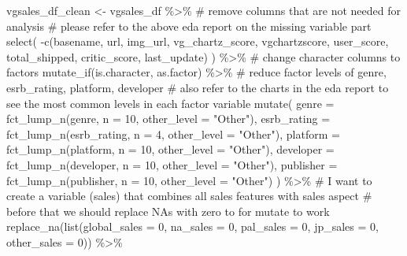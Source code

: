 \documentclass[
  letterpaper,
  DIV=11,
  numbers=noendperiod]{scrartcl}
\newenvironment{Shaded}{\begin{snugshade}}{\end{snugshade}}
\newcommand{\AttributeTok}[1]{\textcolor[rgb]{0.40,0.45,0.13}{#1}}
\newcommand{\CommentTok}[1]{\textcolor[rgb]{0.37,0.37,0.37}{#1}}
\newcommand{\DecValTok}[1]{\textcolor[rgb]{0.68,0.00,0.00}{#1}}
\newcommand{\FunctionTok}[1]{\textcolor[rgb]{0.28,0.35,0.67}{#1}}
\newcommand{\NormalTok}[1]{\textcolor[rgb]{0.00,0.23,0.31}{#1}}
\newcommand{\OtherTok}[1]{\textcolor[rgb]{0.00,0.23,0.31}{#1}}
\newcommand{\SpecialCharTok}[1]{\textcolor[rgb]{0.37,0.37,0.37}{#1}}
\newcommand{\StringTok}[1]{\textcolor[rgb]{0.13,0.47,0.30}{#1}}
\begin{document}
\begin{Shaded}
\begin{Highlighting}[]
\NormalTok{vgsales\_df\_clean }\OtherTok{\textless{}{-}}\NormalTok{ vgsales\_df }\SpecialCharTok{\%\textgreater{}\%}
  \CommentTok{\# remove columns that are not needed for analysis }
  \CommentTok{\# please refer to the above eda report on the missing variable part}
  \FunctionTok{select}\NormalTok{(}
    \SpecialCharTok{{-}}\FunctionTok{c}\NormalTok{(basename, url, img\_url, vg\_chartz\_score, vgchartzscore, }
\NormalTok{       user\_score, total\_shipped, critic\_score, last\_update)}
\NormalTok{    ) }\SpecialCharTok{\%\textgreater{}\%} 
   \CommentTok{\# change character columns to factors}
  \FunctionTok{mutate\_if}\NormalTok{(is.character, as.factor) }\SpecialCharTok{\%\textgreater{}\%} 
  \CommentTok{\# reduce factor levels of genre, esrb\_rating, platform, developer}
  \CommentTok{\# also refer to the charts in the eda report to see the most common levels in each factor variable}
  \FunctionTok{mutate}\NormalTok{(}
    \AttributeTok{genre =} \FunctionTok{fct\_lump\_n}\NormalTok{(genre, }\AttributeTok{n =} \DecValTok{10}\NormalTok{, }\AttributeTok{other\_level =} \StringTok{"Other"}\NormalTok{),}
    \AttributeTok{esrb\_rating =} \FunctionTok{fct\_lump\_n}\NormalTok{(esrb\_rating, }\AttributeTok{n =} \DecValTok{4}\NormalTok{, }\AttributeTok{other\_level =} \StringTok{"Other"}\NormalTok{),}
    \AttributeTok{platform =} \FunctionTok{fct\_lump\_n}\NormalTok{(platform, }\AttributeTok{n =} \DecValTok{10}\NormalTok{, }\AttributeTok{other\_level =} \StringTok{"Other"}\NormalTok{),}
    \AttributeTok{developer =} \FunctionTok{fct\_lump\_n}\NormalTok{(developer, }\AttributeTok{n =} \DecValTok{10}\NormalTok{, }\AttributeTok{other\_level =} \StringTok{"Other"}\NormalTok{),}
    \AttributeTok{publisher =} \FunctionTok{fct\_lump\_n}\NormalTok{(publisher, }\AttributeTok{n =} \DecValTok{10}\NormalTok{, }\AttributeTok{other\_level =} \StringTok{"Other"}\NormalTok{)}
\NormalTok{    ) }\SpecialCharTok{\%\textgreater{}\%} 
  \CommentTok{\# I want to create a variable (sales) that combines all sales features with sales aspect}
  \CommentTok{\# before that we should replace NA\textquotesingle{}s with zero to for mutate to work}
  \FunctionTok{replace\_na}\NormalTok{(}\FunctionTok{list}\NormalTok{(}\AttributeTok{global\_sales =} \DecValTok{0}\NormalTok{,}
                  \AttributeTok{na\_sales =} \DecValTok{0}\NormalTok{,}
                  \AttributeTok{pal\_sales =} \DecValTok{0}\NormalTok{,}
                  \AttributeTok{jp\_sales =} \DecValTok{0}\NormalTok{, }
                  \AttributeTok{other\_sales =} \DecValTok{0}\NormalTok{)) }\SpecialCharTok{\%\textgreater{}\%} 

\end{Highlighting}
\end{Shaded}
\end{document}
